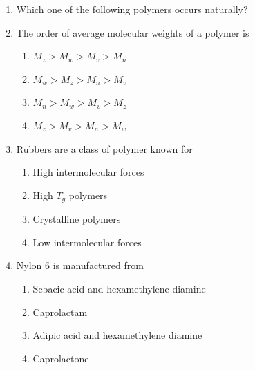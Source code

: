 \documentclass[a4paper,10pt]{article}
\begin{document}
\begin{enumerate}
    \item Which one of the following polymers occurs naturally?
    \hfill{}
    \begin{enumerate}[label=\Alph*)]
    \end{enumerate}

    \item The order of average molecular weights of a polymer is
    \hfill{}
    \begin{enumerate}[label=\Alph*)]
        \item $M_z > M_w > M_v > M_n$
        \item $M_w > M_z > M_n > M_v$
        \item $M_n > M_w > M_v > M_z$
        \item $M_z > M_v > M_n > M_w$
    \end{enumerate}

    \item Rubbers are a class of polymer known for
    \hfill{}
    \begin{enumerate}[label=\Alph*)]
        \item High intermolecular forces
        \item High $T_g$ polymers
        \item Crystalline polymers
        \item Low intermolecular forces
    \end{enumerate}

    \item Nylon 6 is manufactured from
    \hfill{}
    \begin{enumerate}[label=\Alph*)]
        \item Sebacic acid and hexamethylene diamine
        \item Caprolactam
        \item Adipic acid and hexamethylene diamine
        \item Caprolactone
    \end{enumerate}


\end{enumerate}
\end{document}
